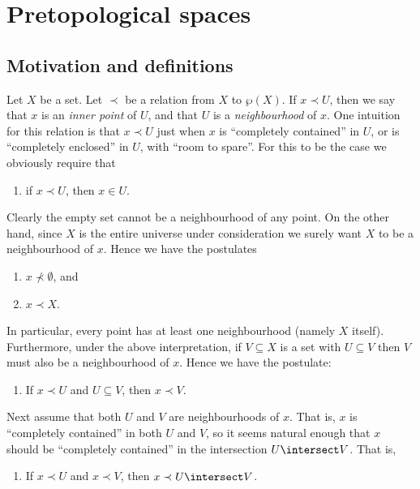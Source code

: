 \documentclass[article, a4paper, 11pt, oneside]{memoir}
\title{\doctitle}
\author{\docauthor}
\numberwithin{equation}{chapter}
\newcommand{\inpoint}{\prec}
\newcommand{\notinpoint}{\not\prec}
\renewcommand{\powerset}[1]{\wp(#1)}
\begin{document}
\maketitle

\chapter{Pretopological spaces}

\section{Motivation and definitions}

Let $X$ be a set. Let $\inpoint$ be a relation from $X$ to $\powerset{X}$. If $x \inpoint U$, then we say that $x$ is an \emph{inner point} of $U$, and that $U$ is a \emph{neighbourhood} of $x$. One intuition for this relation is that $x \inpoint U$ just when $x$ is \enquote{completely contained} in $U$, or is \enquote{completely enclosed} in $U$, with \enquote{room to spare}. For this to be the case we obviously require that
%
\begin{enumerate}[series=axioms]
    \item if $x \inpoint U$, then $x \in U$.
\end{enumerate}
%
Clearly the empty set cannot be a neighbourhood of any point. On the other hand, since $X$ is the entire universe under consideration we surely want $X$ to be a neighbourhood of $x$. Hence we have the postulates
%
\begin{enumerate}[resume*=axioms]
    \item $x \notinpoint \emptyset$, and
    \item $x \inpoint X$.
\end{enumerate}
%
In particular, every point has at least one neighbourhood (namely $X$ itself). Furthermore, under the above interpretation, if $V \subseteq X$ is a set with $U \subseteq V$ then $V$ must also be a neighbourhood of $x$. Hence we have the postulate:
%
\begin{enumerate}[resume*=axioms]
    \item If $x \inpoint U$ and $U \subseteq V$, then $x \inpoint V$.
\end{enumerate}
%
Next assume that both $U$ and $V$ are neighbourhoods of $x$. That is, $x$ is \enquote{completely contained} in both $U$ and $V$, so it seems natural enough that $x$ should be \enquote{completely contained} in the intersection $U \intersect V$. That is,
%
\begin{enumerate}[resume*=axioms]
    \item If $x \inpoint U$ and $x \inpoint V$, then $x \inpoint U \intersect V$.
\end{enumerate}
\end{document}
